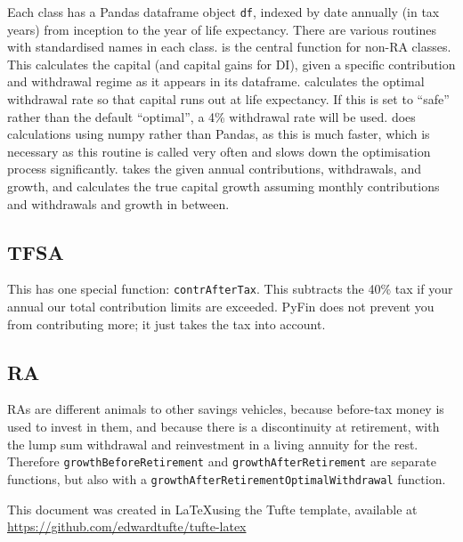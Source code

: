 \documentclass[a4paper, justified]{tufte-handout}
\begin{document}
Each class has a Pandas dataframe object \texttt{df}, indexed by date annually (in tax years) from inception to the year of life expectancy. There are various routines with standardised names in each class.
 is the central function for non-RA classes. This calculates the capital (and capital gains for DI), given a specific contribution and withdrawal regime as it appears in its dataframe.
 calculates the optimal withdrawal rate so that capital runs out at life expectancy. If this is set to ``safe'' rather than the default ``optimal'', a 4\% withdrawal rate will be used.
 does calculations using numpy rather than Pandas, as this is much faster, which is necessary as this routine is called very often and slows down the optimisation process significantly.
 takes the given annual contributions, withdrawals, and growth, and calculates the true capital growth assuming monthly contributions and withdrawals and growth in between.

\subsection{TFSA} This has one special function: \texttt{contrAfterTax}. This subtracts the 40\% tax if your annual our total contribution limits are exceeded. PyFin does not prevent you from contributing more; it just takes the tax into account. 

\subsection{RA} RAs are different animals to other savings vehicles, because before-tax money is used to invest in them, and because there is a discontinuity at retirement, with the lump sum withdrawal and reinvestment in a living annuity for the rest. Therefore \texttt{growthBeforeRetirement} and \texttt{growthAfterRetirement} are separate functions, but also with a \texttt{growthAfterRetirementOptimalWithdrawal} function. 

\bigskip
This document was created in \LaTeX using the Tufte template, available at \url{https://github.com/edwardtufte/tufte-latex}


\end{document}
